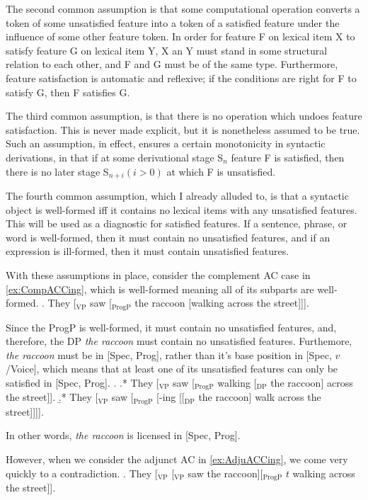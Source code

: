 \documentclass[MilwayThesis]{subfiles}
\begin{document}
The second common assumption is that some computational operation converts a token of some unsatisfied feature into a token of a satisfied feature under the influence of some other feature token.
In order for feature F on lexical item X to satisfy feature G on lexical item Y, X an Y must stand in some structural relation to each other, and F and G must be of the same type.
Furthermore, feature satisfaction is automatic and reflexive; if the conditions are right for F to satisfy G, then F satisfies G.

The third common assumption, is that there is no operation which undoes feature satisfaction.
This is never made explicit, but it is nonetheless assumed to be true.
Such an assumption, in effect, ensures a certain monotonicity in syntactic derivations, in that if at some derivational stage S$_n$ feature F is satisfied, then there is no later stage S$_{n+i} (i > 0)$ at which F is unsatisfied.

The fourth common assumption, which I already alluded to, is that a syntactic object is well-formed iff it contains no lexical items with any unsatisfied features.
This will be used as a diagnostic for satisfied features.
If a sentence, phrase, or word is well-formed, then it must contain no unsatisfied features, and if an expression is ill-formed, then it must contain unsatisfied features.

With these assumptions in place, consider the complement AC case in \cref{ex:CompACCing}, which is well-formed meaning all of its subparts are well-formed.
\ex. They [$_\text{VP}$ saw [$_\text{ProgP}$ the raccoon [walking across the street]]].\label{ex:CompACCing}

Since the ProgP is well-formed, it must contain no unsatisfied features, and, therefore, the DP \textit{the raccoon} must contain no unsatisfied features.
Furthemore, \textit{the raccoon} must be in [Spec, Prog], rather than it's base position in [Spec, $v$/Voice], which means that at least one of its unsatisfied features can only be satisfied in [Spec, Prog]. 
\ex.
\a.* They [$_\text{VP}$ saw [$_\text{ProgP}$ walking [$_\text{DP}$ the raccoon] across the street]].
\b.* They [$_\text{VP}$ saw [$_\text{ProgP}$ [-ing [[$_\text{DP}$ the raccoon] walk across the street]]]].

In other words, \textit{the raccoon} is licensed in [Spec, Prog].

However, when we consider the adjunct AC in \cref{ex:AdjuACCing}, we come very quickly to a contradiction.
\ex. They [$_\text{VP}$ [$_\text{VP}$ saw the raccoon][$_\text{ProgP}$ $t$ walking across the street]].\label{ex:AdjuACCing}
\end{document}
